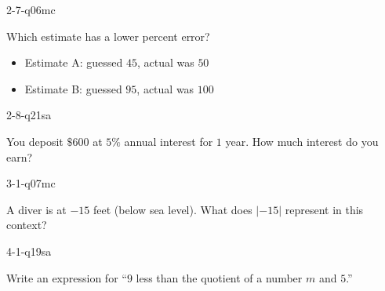 \begin{practiceQuestion}{2-7-q06}{mc}
\begin{questionText}
Which estimate has a lower percent error?
\begin{itemize}
    \item Estimate A: guessed $45$, actual was $50$
    \item Estimate B: guessed $95$, actual was $100$
\end{itemize}
\end{questionText}
\end{practiceQuestion}

\begin{practiceQuestion}{2-8-q21}{sa}
\begin{questionText}
You deposit $\$600$ at $5\%$ annual interest for $1$ year. How much interest do you earn?
\end{questionText}
\end{practiceQuestion}

\begin{practiceQuestion}{3-1-q07}{mc}
\begin{questionText}
A diver is at $-15$ feet (below sea level). What does $|-15|$ represent in this context?
\end{questionText}
\end{practiceQuestion}

\begin{practiceQuestion}{4-1-q19}{sa}
\begin{questionText}
Write an expression for ``$9$ less than the quotient of a number $m$ and $5$.''
\end{questionText}
\end{practiceQuestion}

